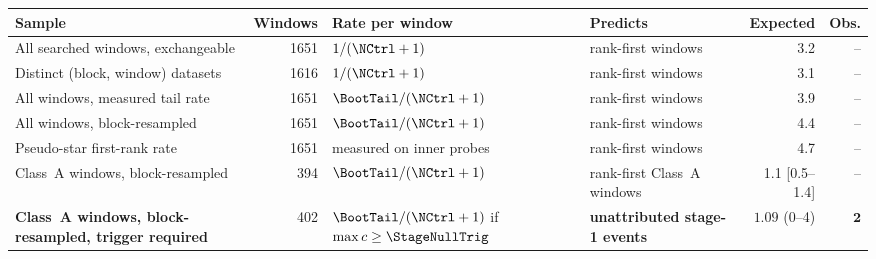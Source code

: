 \begin{tabular}{@{}p{}rp{}p{}rr@{}}
\toprule
Sample & Windows & Rate per window & Predicts & Expected & Obs. \\
\midrule
All searched windows, exchangeable & 1651 & $1/(\NCtrl+1)$ & rank-first windows & 3.2 & -- \\
Distinct (block, window) datasets & 1616 & $1/(\NCtrl+1)$ & rank-first windows & 3.1 & -- \\
All windows, measured tail rate & 1651 & $\BootTail/(\NCtrl+1)$ & rank-first windows & 3.9 & -- \\
All windows, block-resampled & 1651 & $\BootTail/(\NCtrl+1)$ & rank-first windows & 4.4 & -- \\
Pseudo-star first-rank rate & 1651 & measured on inner probes & rank-first windows & 4.7 & -- \\
Class~A windows, block-resampled & 394 & $\BootTail/(\NCtrl+1)$ & rank-first Class~A windows & 1.1 [0.5--1.4] & -- \\
\textbf{Class~A windows, block-resampled, trigger required} & 402 & $\BootTail/(\NCtrl+1)$ if $\max c\geq\StageNullTrig$ & \textbf{unattributed stage-1 events} & $\mathbf{1.09}$ (0--4) & $\mathbf{2}$ \\
\bottomrule
\end{tabular}
